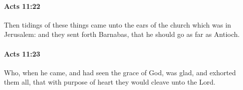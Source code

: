 		\paragraph{Acts 11:22} %
			\label{ACTS-11-22}

			Then tidings of these things came unto the ears of the church which was in Jerusalem: and they sent forth Barnabas, that he should go as far as Antioch.

			\begin{framed}
			\scriptsize
				\begin{compactdesc}
					\item[SBLG] 
				\end{compactdesc}
			\end{framed}

		\paragraph{Acts 11:23} %
			\label{ACTS-11-23}

			Who, when he came, and had seen the grace of God, was glad, and exhorted them all, that with purpose of heart they would cleave unto the Lord.


